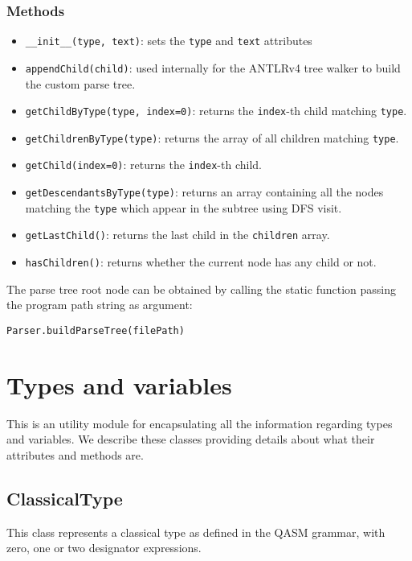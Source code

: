 \documentclass[12pt,a4paper]{report}
\theoremstyle{definition}
\theoremstyle{definition}
\theoremstyle{definition}
\begin{document}
\subsubsection{Methods}
\begin{itemize}
    \itemsep 0em
    \item \texttt{\_\_init\_\_(type, text)}: sets the \texttt{type} and \texttt{text} attributes
    \item \texttt{appendChild(child)}: used internally for the ANTLRv4 tree walker to build the custom parse tree.
    \item \texttt{getChildByType(type, index=0)}: returns the \texttt{index}-th child matching \texttt{type}.
    \item \texttt{getChildrenByType(type)}: returns the array of all children matching \texttt{type}.
    \item \texttt{getChild(index=0)}: returns the \texttt{index}-th child.
    \item \texttt{getDescendantsByType(type)}: returns an array containing all the nodes matching the \texttt{type} which appear in the subtree using DFS visit.
    \item \texttt{getLastChild()}: returns the last child in the \texttt{children} array.
    \item \texttt{hasChildren()}: returns whether the current node has any child or not.
\end{itemize}
The parse tree root node can be obtained by calling the static function passing the program path string as argument:
\begin{lstlisting}
Parser.buildParseTree(filePath)
\end{lstlisting}


\section{Types and variables}
This is an utility module for encapsulating all the information regarding types and variables.
We describe these classes providing details about what their attributes and methods are.

\subsection{ClassicalType}
This class represents a classical type as defined in the QASM grammar, with zero, one or two designator expressions.
\end{document}
